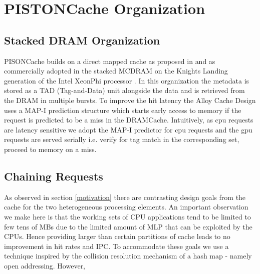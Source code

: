 \section{PISTONCache Organization} \label{mechanism}
\subsection{Stacked DRAM Organization} \label{rbhvblp}
PISONCache builds on a direct mapped cache as proposed in \cite{alloy} and as commercially adopted in the stacked MCDRAM on the Knights Landing generation of the Intel XeonPhi processor \cite{xeonphi}. In this organization the metadata is stored as a TAD (Tag-and-Data) unit alongside the data and is retrieved from the DRAM in multiple bursts. To improve the hit latency the Alloy Cache Design uses a MAP-I prediction structure which starts early access to memory if the request is predicted to be a miss in the DRAMCache. Intuitively, as cpu requests are latency sensitive we adopt the MAP-I predictor for cpu requests and the gpu requests are served serially i.e. verify for tag match in the corresponding set, proceed to memory on a miss.
\subsection{Chaining Requests}
As observed in section \ref{motivation} there are contrasting design goals from the cache for the two heterogeneous processing elements. An important observation we make here is that the working sets of CPU applications tend to be limited to few tens of MBs due to the limited amount of MLP that can be exploited by the CPUs. Hence providing larger than certain partitions of cache leads to no improvement in hit rates and IPC. To accommodate these goals we use a technique inspired by the collision resolution mechanism of a hash map - namely open addressing. However, 